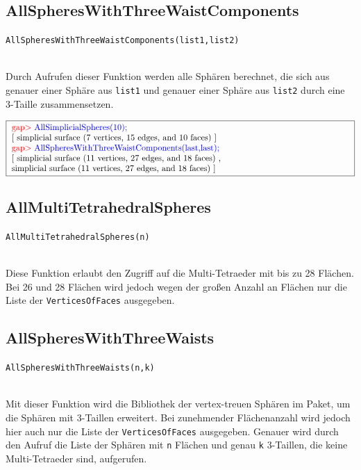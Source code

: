 \documentclass[12pt,titlepage,twoside,cleardoublepage]{article}
\theoremstyle{nummermitklammern}
\numberwithin{equation}{section}
\begin{document}
\subsection{AllSpheresWithThreeWaistComponents}
\begin{large}
\texttt{AllSpheresWithThreeWaistComponents(list1,list2)}
\end{large}\\
Durch Aufrufen dieser Funktion werden alle Sphären berechnet, die sich aus genauer einer Sphäre aus \texttt{list1} und genauer einer Sphäre aus \texttt{list2} durch eine 3-Taille zusammensetzen.
\begin{center}
$\fbox{
\parbox{14cm}{
\textcolor{red}{gap$>$} \textcolor{blue}{AllSimplicialSpheres(10);}\newline
[ simplicial surface (7 vertices, 15 edges, and 10 faces) ]\newline
\textcolor{red}{gap$>$} \textcolor{blue}{AllSpheresWithThreeWaistComponents(last,last);}\newline
[ simplicial surface (11 vertices, 27 edges, and 18 faces)
    ,\newline
  simplicial surface (11 vertices, 27 edges, and 18 faces)
 ]
}
}$
\end{center}
\subsection{AllMultiTetrahedralSpheres}
\begin{large}
\texttt{AllMultiTetrahedralSpheres(n)}
\end{large}\\
Diese Funktion erlaubt den Zugriff auf die Multi-Tetraeder mit bis zu 28 Flächen. Bei 26 und 28 Flächen wird jedoch wegen der großen Anzahl an Flächen nur die Liste der \texttt{VerticesOfFaces} ausgegeben.
\subsection{AllSpheresWithThreeWaists}
\begin{large}
\texttt{AllSpheresWithThreeWaists(n,k)}
\end{large}\\
Mit dieser Funktion wird die Bibliothek der vertex-treuen Sphären im Paket, um die Sphären mit 3-Taillen erweitert.  Bei zunehmender Flächenanzahl wird jedoch hier auch nur die Liste der \texttt{VerticesOfFaces} ausgegeben. Genauer wird durch den Aufruf die Liste der Sphären mit \texttt{n} Flächen und genau \texttt{k} 3-Taillen, die keine Multi-Tetraeder sind, aufgerufen.
\end{document}

